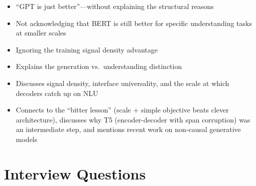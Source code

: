 \begin{interviewq}
\redflags
\begin{itemize}
    \item ``GPT is just better''---without explaining the structural reasons
    \item Not acknowledging that BERT is still better for specific understanding tasks at smaller scales
    \item Ignoring the training signal density advantage
\end{itemize}


\goodgreat
\begin{itemize}
    \item {} Explains the generation vs.\ understanding distinction
    \item {} Discusses signal density, interface universality, and the scale at which decoders catch up on NLU
    \item {} Connects to the ``bitter lesson'' (scale + simple objective beats clever architecture), discusses why T5 (encoder-decoder with span corruption) was an intermediate step, and mentions recent work on non-causal generative models
\end{itemize}

\end{interviewq}

\section{Interview Questions}
\label{sec:ssl_interview}

